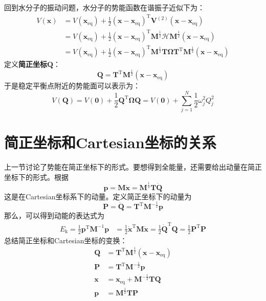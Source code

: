     回到水分子的振动问题，水分子的势能函数在谐振子近似下为：
    \begin{equation}
        \begin{split}
        V(\bm{x}) &= V(\bm{x}_\mathrm{eq}) + \frac 12 (\bm{x-x}_\mathrm{eq})^\mathrm{T} \bm{V}^{(2)} (\bm{x-x}_\mathrm{eq})\\
        &= V(\bm{x}_\mathrm{eq}) + \frac 12 (\bm{x-x}_\mathrm{eq})^\mathrm{T} \bm{M}^{\frac 12}\bm{\mathcal{H}} \bm{M}^{\frac 12} (\bm{x-x}_\mathrm{eq})\\
        &= V(\bm{x}_\mathrm{eq}) + \frac 12 (\bm{x-x}_\mathrm{eq})^\mathrm{T} \bm{M}^{\frac 12} \bm{T\Omega T}^\mathrm{T} \bm{M}^{\frac 12} (\bm{x-x}_\mathrm{eq})
        \end{split}
    \end{equation}
    定义\textbf{简正坐标}$\bm{Q}$：
    \begin{equation}
        \bm{Q} = \bm{T}^\mathrm{T} \bm{M}^{\frac 12} (\bm{x-x}_\mathrm{eq})
    \end{equation}
    于是稳定平衡点附近的势能面可以表示为：
    \begin{equation}
        V(\bm{Q}) = V(\bm{0}) + \frac 12 \bm{Q}^\mathrm{T} \bm{\Omega Q} = V(\bm{0}) + \sum_{j=1}^N \frac 12 \omega_j^2 Q_j^2
    \end{equation}

    \section{简正坐标和Cartesian坐标的关系}
    上一节讨论了势能在简正坐标下的形式。要想得到全能量，还需要给出动量在简正坐标下的形式。根据
    \begin{equation*}
        \bm{p} = \bm{M\dot{x}} = \bm{M}^{\frac 12} \bm{T\dot{Q}}
    \end{equation*}
    这是在Cartesian坐标系下的动量。定义简正坐标下的动量为
    \begin{equation*}
        \bm{P = \dot{Q}} = \bm{T}^\mathrm{T} \bm{M}^{-\frac 12} \bm{p}
    \end{equation*}
    那么，可以得到动能的表达式为
    \begin{align*}
        E_\mathrm{k} = \frac 12 \bm{p}^{\mathrm{T}} \bm{M}^{-1} \bm{p} &= \frac 12 \bm{\dot{x}}^\mathrm{T}\bm{M\dot{x}}
        = \frac 12 \bm{\dot{Q}}^\mathrm{T} \bm{Q}
        = \frac 12 \bm{P}^{\mathrm{T}} \bm{P}
    \end{align*}
    总结简正坐标和Cartesian坐标的变换：
    \begin{align*}
        \bm{Q} &= \bm{T}^\mathrm{T} \bm{M}^{\frac 12} (\bm{x-x}_\mathrm{eq})\\
        \bm{P} &= \bm{T}^\mathrm{T} \bm{M}^{-\frac 12} \bm{p}\\
        \bm{x} &= \bm{x}_\mathrm{eq} + \bm{M}^{-\frac 12}\bm{TQ}\\
        \bm{p} &= \bm{M}^{\frac 12}\bm{TP}
    \end{align*}

